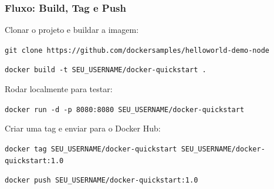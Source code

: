 \begin{frame}
  \frametitle{Fluxo: Build, Tag e Push}
  Clonar o projeto e buildar a imagem:

  \vspace{0.3em}
  \texttt{git clone https://github.com/dockersamples/helloworld-demo-node}

  \vspace{0.3em}
  \texttt{docker build -t SEU\_USERNAME/docker-quickstart .}

  \vspace{0.5em}
  Rodar localmente para testar:

  \vspace{0.3em}
  \texttt{docker run -d -p 8080:8080 SEU\_USERNAME/docker-quickstart}

  \vspace{0.5em}
  Criar uma tag e enviar para o Docker Hub:

  \vspace{0.3em}
  \texttt{docker tag SEU\_USERNAME/docker-quickstart SEU\_USERNAME/docker-quickstart:1.0}

  \vspace{0.3em}
  \texttt{docker push SEU\_USERNAME/docker-quickstart:1.0}
\end{frame}